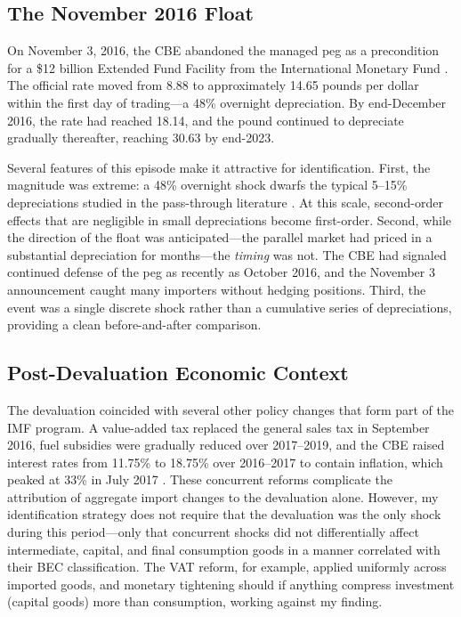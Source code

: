 \documentclass[12pt]{article}
\begin{document}
\subsection{The November 2016 Float}

On November 3, 2016, the CBE abandoned the managed peg as a precondition for a \$12 billion Extended Fund Facility from the International Monetary Fund \citep{imf2017egypt}. The official rate moved from 8.88 to approximately 14.65 pounds per dollar within the first day of trading---a 48\% overnight depreciation. By end-December 2016, the rate had reached 18.14, and the pound continued to depreciate gradually thereafter, reaching 30.63 by end-2023.

Several features of this episode make it attractive for identification. First, the magnitude was extreme: a 48\% overnight shock dwarfs the typical 5--15\% depreciations studied in the pass-through literature \citep{campa2005exchange}. At this scale, second-order effects that are negligible in small depreciations become first-order. Second, while the direction of the float was anticipated---the parallel market had priced in a substantial depreciation for months---the \textit{timing} was not. The CBE had signaled continued defense of the peg as recently as October 2016, and the November 3 announcement caught many importers without hedging positions. Third, the event was a single discrete shock rather than a cumulative series of depreciations, providing a clean before-and-after comparison.

\subsection{Post-Devaluation Economic Context}

The devaluation coincided with several other policy changes that form part of the IMF program. A value-added tax replaced the general sales tax in September 2016, fuel subsidies were gradually reduced over 2017--2019, and the CBE raised interest rates from 11.75\% to 18.75\% over 2016--2017 to contain inflation, which peaked at 33\% in July 2017 \citep{imf2019egypt}. These concurrent reforms complicate the attribution of aggregate import changes to the devaluation alone. However, my identification strategy does not require that the devaluation was the only shock during this period---only that concurrent shocks did not differentially affect intermediate, capital, and final consumption goods in a manner correlated with their BEC classification. The VAT reform, for example, applied uniformly across imported goods, and monetary tightening should if anything compress investment (capital goods) more than consumption, working against my finding.
\end{document}
